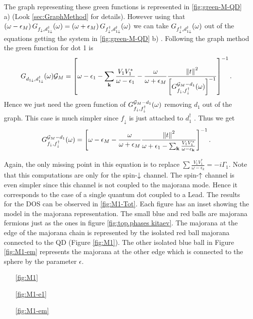 The graph representing these green functions is represented in \ref{fig:green-M-QD} a)  (Look \ref{sec:GraphMethod} for details). However using that $\left(\omega-\epsilon_{M}\right)G_{f_{\downarrow},d_{1\downarrow}^{\dagger}}(\omega)=\left(\omega+\epsilon_{M}\right)G_{f_{\downarrow}^{\dagger},d_{1\downarrow}^{\dagger}}(\omega)$ we can take
 $G_{f_{\downarrow}^{\dagger},d_{1\downarrow}^{\dagger}}(\omega)$ out of the equations getting the system in \ref{fig:green-M-QD} b) .  Following the graph method the green function for dot 1 is
\begin{equation}
    G_{d_{1\downarrow},d_{1\downarrow}^{\dagger}}(\omega){\mathcal{G}_M}=\left[\omega-\epsilon_{1}-\sum_{\mathbf{k}}\frac{V_{1}V_{1}^{*}}{\omega-\epsilon_{1}}-\frac{\omega}{\omega+\epsilon_{M}}\frac{\left\Vert t\right\Vert ^{2}}{\left[G_{f_{\downarrow},f_{\downarrow}^{\dagger}}^{ \mathcal{G}_M-d_{1}} (\omega)\right]^{-1}}\right]^{-1}.
\end{equation}
Hence we just need the green function of $G_{f_{\downarrow},f_{\downarrow}^{\dagger}}^{ \mathcal{G}_M-d_{1}} (\omega)$ removing $d_1$ out of the graph. This case is much simpler since $f_\downarrow$ is just attached to $d^\dagger_1$ . Thus we get
\begin{equation}
    G_{f_{\downarrow},f_{\downarrow}^{\dagger}}^{ \mathcal{G}_M-d_{1}} (\omega)=\left[\omega-\epsilon_{M}-\frac{\omega}{\omega+\epsilon_{M}}\frac{\left\Vert t\right\Vert ^{2}}{\omega+\epsilon_{1}-\sum_{\mathbf{k}}\frac{V_{1}V_{1}^{*}}{\omega-\epsilon_{\mathbf{k}}}}\right]^{-1}.
\end{equation}

Again, the only missing point in this equation is to replace $\sum \frac{V_1V^*_1}{\omega -\epsilon_k}= -i\Gamma_1$. Note that this computations are only for the spin-$\downarrow$ channel. The spin-$\uparrow$ channel is even simpler since this channel is not coupled to the majorana mode. Hence it corresponds to the case of a single quantum dot coupled to a Lead.  The results for the DOS can be observed in \ref{fig:M1-Tot}. Each figure has an inset showing the model in the majorana representation. The small blue and red balls are majorana fermions just as the ones in figure \ref{fig:top.phases kitaev}. The majorana at the edge of the majorana chain is represented by the isolated red ball majorana connected to the QD (Figure \ref{fig:M1}). The other isolated blue ball in Figure \ref{fig:M1-em} represents the majorana at the other edge which is connected to the sphere by the parameter $\epsilon$. 

\begin{itemize}
    \item[\ref{fig:M1}] 
    \item[\ref{fig:M1-e1}]
    \item[\ref{fig:M1-em}]
\end{itemize}




